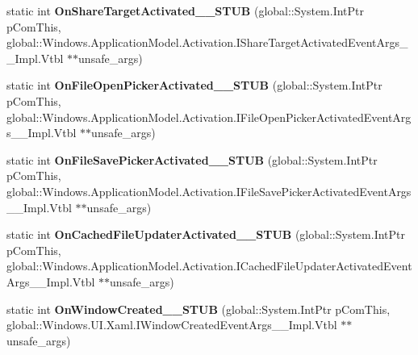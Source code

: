 \begin{DoxyCompactItemize}
static int {\bfseries On\+Share\+Target\+Activated\+\_\+\+\_\+\+S\+T\+UB} (global\+::\+System.\+Int\+Ptr p\+Com\+This, global\+::\+Windows.\+Application\+Model.\+Activation.\+I\+Share\+Target\+Activated\+Event\+Args\+\_\+\+\_\+\+Impl.\+Vtbl $\ast$$\ast$unsafe\+\_\+args)
\item 
\mbox{\label{struct_windows_1_1_u_i_1_1_xaml_1_1_i_application_overrides_____impl_1_1_vtbl_aeedfddd71f49afd2dded76968a4140d6}} 
static int {\bfseries On\+File\+Open\+Picker\+Activated\+\_\+\+\_\+\+S\+T\+UB} (global\+::\+System.\+Int\+Ptr p\+Com\+This, global\+::\+Windows.\+Application\+Model.\+Activation.\+I\+File\+Open\+Picker\+Activated\+Event\+Args\+\_\+\+\_\+\+Impl.\+Vtbl $\ast$$\ast$unsafe\+\_\+args)
\item 
\mbox{\label{struct_windows_1_1_u_i_1_1_xaml_1_1_i_application_overrides_____impl_1_1_vtbl_a69f9ef1a1651ef58133a816b423a9270}} 
static int {\bfseries On\+File\+Save\+Picker\+Activated\+\_\+\+\_\+\+S\+T\+UB} (global\+::\+System.\+Int\+Ptr p\+Com\+This, global\+::\+Windows.\+Application\+Model.\+Activation.\+I\+File\+Save\+Picker\+Activated\+Event\+Args\+\_\+\+\_\+\+Impl.\+Vtbl $\ast$$\ast$unsafe\+\_\+args)
\item 
\mbox{\label{struct_windows_1_1_u_i_1_1_xaml_1_1_i_application_overrides_____impl_1_1_vtbl_a621778ff6817d2ea373e2f5a1f42bd9b}} 
static int {\bfseries On\+Cached\+File\+Updater\+Activated\+\_\+\+\_\+\+S\+T\+UB} (global\+::\+System.\+Int\+Ptr p\+Com\+This, global\+::\+Windows.\+Application\+Model.\+Activation.\+I\+Cached\+File\+Updater\+Activated\+Event\+Args\+\_\+\+\_\+\+Impl.\+Vtbl $\ast$$\ast$unsafe\+\_\+args)
\item 
\mbox{\label{struct_windows_1_1_u_i_1_1_xaml_1_1_i_application_overrides_____impl_1_1_vtbl_a9afed578176233dce858655f137f848e}} 
static int {\bfseries On\+Window\+Created\+\_\+\+\_\+\+S\+T\+UB} (global\+::\+System.\+Int\+Ptr p\+Com\+This, global\+::\+Windows.\+U\+I.\+Xaml.\+I\+Window\+Created\+Event\+Args\+\_\+\+\_\+\+Impl.\+Vtbl $\ast$$\ast$unsafe\+\_\+args)
\item 
$$
\end{DoxyCompactItemize}

